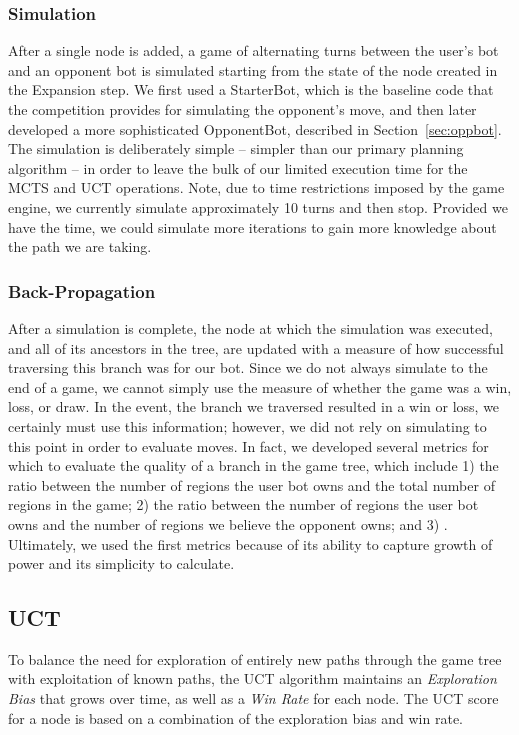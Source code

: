 \documentclass[a4paper,11pt]{article}
\begin{document}
\subsubsection{Simulation}
After a single node is added, a game of alternating turns between the user's bot and an 
opponent bot is simulated starting from the state of the node created in the Expansion step.  
We first used a StarterBot, which is the baseline code that the competition provides for simulating
the opponent's move, and then later developed a more sophisticated OpponentBot, described in
Section~\ref{sec:oppbot}.  The simulation is deliberately simple -- simpler 
than our primary planning algorithm -- in order to leave the bulk of our limited execution 
time for the MCTS and UCT operations.  Note, due to time restrictions imposed by the game engine, 
we currently simulate approximately 10 turns and then stop.  Provided we have the time, we could
simulate more iterations to gain more knowledge about the path we are taking.

\subsubsection{Back-Propagation}
After a simulation is complete, the node at which the simulation was executed, and all of its 
ancestors in the tree, are updated with a measure of how successful traversing this branch was 
for our bot. Since we do not always simulate to the end of a game, we cannot simply use the measure
of whether the game was a win, loss, or draw.  In the event, the branch we traversed resulted in a win
or loss, we certainly must use this information; however, we did not rely on simulating to this point
in order to evaluate moves. In fact, we developed several metrics for which to evaluate
the quality of a branch in the game tree, which include 1) the ratio between the number of regions
the user bot owns and the total number of regions in the game; 2) the ratio between the number of 
regions the user bot owns  and the number of regions we believe the opponent owns; and 3) . 
Ultimately, we used the first metrics because of its ability to capture growth of power and 
its simplicity to calculate.  


\subsection{UCT}\label{sec:uct}
To balance the need for exploration of entirely new paths through the game tree with
exploitation of known paths, the UCT algorithm maintains an \emph{Exploration Bias} that grows
over time, as well as a \emph{Win Rate} for each node.  The UCT score for a node is based on a
combination of the exploration bias and win rate.
\end{document}
